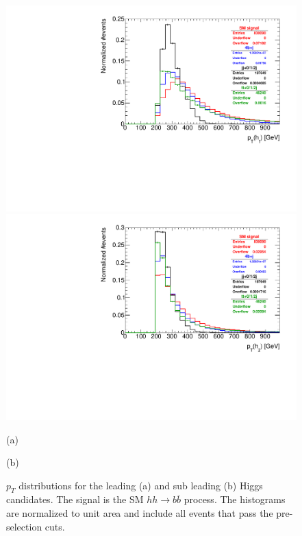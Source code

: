 \begin{figure}
	\centering
	\begin{minipage}{.5\textwidth}
		\centering
		\includegraphics[trim={.65cm 0 0 0},clip,width=\linewidth]{./Figures/hist_h1_pt.pdf}
	\end{minipage}%
	\begin{minipage}{.5\textwidth}
		\centering
		\includegraphics[trim={0 0 .65cm 0},clip,width=\linewidth]{./Figures/hist_h2_pt.pdf}
	\end{minipage}
	\begin{minipage}[t]{0.5\textwidth}
		\caption*{(a)}
	\end{minipage}%
	\hfill
	\begin{minipage}[t]{0.5\textwidth}
		\caption*{(b)}
	\end{minipage}
	\caption{$p_T$ distributions for the leading (a) and sub leading (b) Higgs candidates. The signal is the SM $hh\rightarrow b\overline{b}$ process. The histograms are normalized to unit area and include all events that pass the pre-selection cuts.}
	\label{fig:h1h2_pt}
\end{figure}


